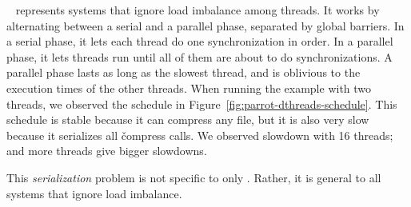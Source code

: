 

\dthreads~\cite{dthreads:sosp11} represents \smt systems that
ignore load imbalance among threads.  It works by
alternating between a serial and a parallel phase, separated by global
barriers.  In a serial phase, it lets each thread do one synchronization in
order.  In a parallel phase, it lets threads run until all of them are about
to do synchronizations.  A parallel phase lasts as long as the slowest
thread, and is oblivious to the execution times of the other threads.  When
running the example with two threads, we observed the \dthreads schedule
in Figure~\ref{fig:parrot-dthreads-schedule}.  This schedule is stable because it
can compress any file, but it is also very slow because it serializes all
\v{compress} calls.  We observed \dthreadsexampleoverhead slowdown
with 16 threads; and more threads give bigger slowdowns.

This \emph{serialization} problem is not specific to only
\dthreads. Rather, it is general to all \smt systems that ignore load
imbalance.

